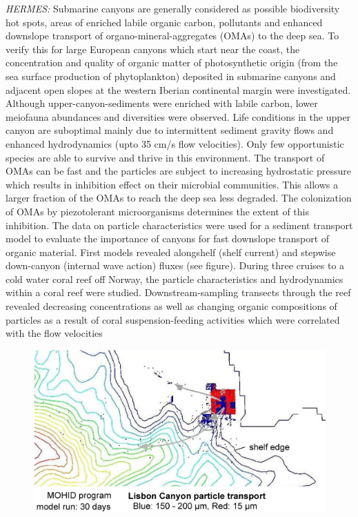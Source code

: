 {\it HERMES:} Submarine canyons are generally considered as
possible biodiversity hot spots, areas of enriched labile organic
carbon, pollutants and enhanced downslope transport of
organo-mineral-aggregates (OMAs) to the deep sea. To verify this
for large European canyons which start near the coast, the
concentration and quality of organic matter of photosynthetic
origin (from the sea surface production of phytoplankton)
deposited in submarine canyons and adjacent open slopes at the
western Iberian continental margin were investigated. Although
upper-canyon-sediments were enriched with labile carbon, lower
meiofauna abundances and diversities were observed. Life
conditions in the upper canyon  are suboptimal mainly due to
intermittent sediment gravity flows and enhanced hydrodynamics
(upto 35 cm/s flow velocities). Only few opportunistic species are
able to survive and thrive in this environment. The transport of
OMAs can be fast and the particles are subject to increasing
hydrostatic pressure which results in inhibition effect on their
microbial communities.  This allows a larger fraction of the OMAs
to reach the deep sea less degraded. The colonization of OMAs by
piezotolerant microorganisms determines the extent of this
inhibition. The data on particle characteristics were used for a
sediment transport model to evaluate the importance of canyons for
fast downslope transport of organic material. First models
revealed alongshelf (shelf current) and stepwise down-canyon
(internal wave action) fluxes (see figure). During three cruises
to a cold water coral reef off Norway, the particle
characteristics and hydrodynamics within a coral reef were
studied. Downstream-sampling transects through the reef revealed
decreasing concentrations as well as changing organic compositions
of particles as a result of coral suspension-feeding activities
which were correlated with the flow velocities

\begin{figure}[ht]
  \begin{center}
    \includegraphics[width=\hsize]{Thomsen/LisboaModel.jpg}
    \label{fig:Thomsen_2006_Fig}
   \end{center}
\end{figure}


